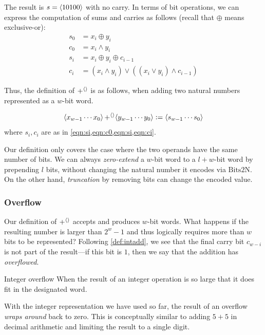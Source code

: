 The result is $s=\langle 10100 \rangle$ with no carry.  In terms of bit
operations, we can express the computation of sums and carries as
follows (recall that $\oplus$ means exclusive-or):
\begin{align}
  s_{0} &= x_{i} \oplus y_{i} \label{eqn:s0} \\
  c_{0} &= x_{i} \land y_{i} \label{eqn:c0} \\
  s_{i} &= x_{i} \oplus y_{i} \oplus c_{i-1} \label{eqn:si} \\
  c_{i} &= (x_{i} \land y_{i})\lor ((x_{i}\lor y_{i})\land c_{i-1}) \label{eqn:ci}
\end{align}

Thus, the definition of $\operatorname{+^{\langle\rangle}}$ is as follows, when adding two
natural numbers represented as a $w$-bit word.
\begin{definition}
\begin{align*}
  \langle x_{w-1}\cdots{}x_{0} \rangle \operatorname{+^{\langle\rangle}} \langle y_{w-1}\cdots{}y_{0} \rangle \vcentcolon=
  \langle s_{w-1}\cdots{}s_{0} \rangle
\end{align*}
where $s_{i},c_{i}$ are as in \cref{eqn:si,eqn:c0,eqn:si,eqn:ci}.
\label{def:intadd}
\end{definition}

Our definition only covers the case where the two operands have the
same number of bits.  We can always \emph{zero-extend} a $w$-bit word
to a $l+w$-bit word by prepending $l$ bits, without changing the
natural number it encodes via $\mathrm{Bits2N}$.  On the other hand,
\emph{truncation} by removing bits can change the encoded value.

\subsubsection{Overflow}

Our definition of $\operatorname{+^{\langle\rangle}}$ accepts and produces $w$-bit words.  What
happens if the resulting number is larger than $2^{w}-1$ and thus
logically requires more than $w$ bits to be represented?  Following
\cref{def:intadd}, we see that the final carry bit $c_{w-i}$ is not
part of the result---if this bit is $1$, then we say that the addition
has \emph{overflowed}.

\begin{definition}{Integer overflow}
  When the result of an integer operation is so large that it does fit
  in the designated word.
\end{definition}

With the integer representation we have used so far, the result of an
overflow \emph{wraps around} back to zero.  This is conceptually
similar to adding $5+5$ in decimal arithmetic and limiting the result
to a single digit.


